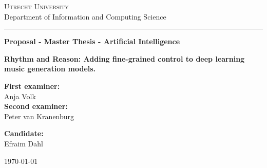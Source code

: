 
\begin{titlepage}

\begin{center}
{\scshape \Large
Utrecht University\\
}
\vspace{4mm}
{\Large
Department of Information and Computing Science
}
\vspace{8mm}
\hrule
\vspace{4mm}
\begin{spacing}{1.8}
{\large\textbf{
Proposal - Master Thesis - Artificial Intelligence
}}
\end{spacing}
\vspace{42mm}

\begin{spacing}{2.0}
{\Large \bf Rhythm and Reason: Adding fine-grained control to deep learning music generation models.}
\\
\end{spacing}
\end{center}

\vfill
\noindent
\begin{minipage}[t]{0.5\textwidth}
\large
\textbf{First examiner:
}\\
Anja Volk\\
 \vspace{5mm}
\textbf{Second examiner:}\\
Peter van Kranenburg \\
\end{minipage}
\hfill
\begin{minipage}[t]{0.5\textwidth}\raggedleft
\large
\textbf{Candidate:}\\
Efraim Dahl\\
\end{minipage}

\vspace{24mm}

\begin{center}
\large \today
\end{center}

\end{titlepage}
\restoregeometry